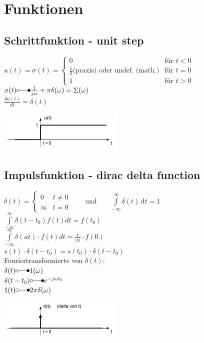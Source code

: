 

\section{Funktionen}
	\subsection{Schrittfunktion - unit step}
		\begin{minipage}{10cm}
			$u(t) = \sigma(t) =	\begin{cases}
						 0 & \text{f\"ur } t < 0 \\
						 \frac{1}{2} \text{(praxis)}  \text{ oder undef. (math.)} & \text{f\"ur } t = 0 \\
						 1 & \text{f\"ur } t > 0
					\end{cases}
			$
			$\sigma(t) \laplace \frac{1}{j\omega} + \pi\delta(\omega) = \Sigma(\omega)$ \\
			$\frac{du(t)}{dt}=\delta(t)$
		\end{minipage}
		\begin{minipage}{8cm}
			\includegraphics[width=6cm]{./bilder/unitstep.png}
		\end{minipage}

	\subsection{Impulsfunktion - dirac delta function}
		\begin{minipage}{10cm}
			$\delta (t)=\begin{cases} 0 & t\ne 0\\\infty & t=0\end{cases} \qquad
			\text{und} \qquad \int\limits_{-\infty}^\infty \delta(t) \, \mathrm dt = 1 $\\
			$\int\limits_{-\infty}^{\infty}\delta(t-t_0)f(t)dt=f(t_0)$\\
			$\int\limits_{-\infty}^{\infty}\delta(at)\cdot f(t) dt = \frac{1}{|a|} \cdot f(0)$\\
			$s(t) \cdot \delta(t-t_0) = s(t_0)\cdot \delta(t-t_0)$\\
			Fouriertransformierte von $\delta(t)$:\\
			$\delta(t) \laplace 1(\omega)$\\
			$\delta(t-t_0) \laplace e^{-j\omega t_0}$\\
			$1(t) \laplace 2\pi \delta(\omega)$
		\end{minipage}
		\begin{minipage}{8cm}
			\includegraphics[width=6cm]{./bilder/diracimpulse.png}
		\end{minipage}
		
